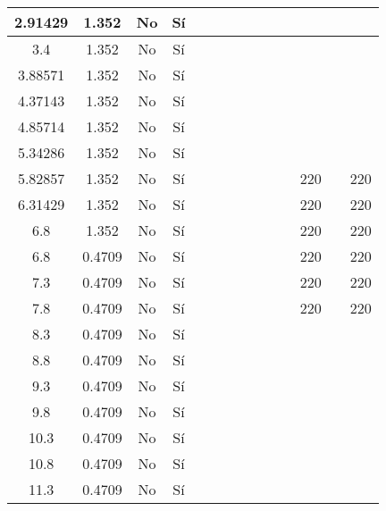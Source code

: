 \begin{table}[H]
{\begin{tabular}{|c|c|c|c|c|c|c|c|c|c|c|c|c|c|}
\hline
2.91429 & 1.352 & No  & Sí  &     &     &     &     &     &     &     &     &     &  \bigstrut\\
\hline
3.4 & 1.352 & No  & Sí  &     &     &     &     &     &     &     &     &     &  \bigstrut\\
\hline
3.88571 & 1.352 & No  & Sí  &     &     &     &     &     &     &     &     &     &  \bigstrut\\
\hline
4.37143 & 1.352 & No  & Sí  &     &     &     &     &     &     &     &     &     &  \bigstrut\\
\hline
4.85714 & 1.352 & No  & Sí  &     &     &     &     &     &     &     &     &     &  \bigstrut\\
\hline
5.34286 & 1.352 & No  & Sí  &     &     &     &     &     &     &     &     &     &  \bigstrut\\
\hline
5.82857 & 1.352 & No  & Sí  &     &     &     &     &     &     &     & 220 &     & 220 \bigstrut\\
\hline
6.31429 & 1.352 & No  & Sí  &     &     &     &     &     &     &     & 220 &     & 220 \bigstrut\\
\hline
6.8 & 1.352 & No  & Sí  &     &     &     &     &     &     &     & 220 &     & 220 \bigstrut\\
\hline
6.8 & 0.4709 & No  & Sí  &     &     &     &     &     &     &     & 220 &     & 220 \bigstrut\\
\hline
7.3 & 0.4709 & No  & Sí  &     &     &     &     &     &     &     & 220 &     & 220 \bigstrut\\
\hline
7.8 & 0.4709 & No  & Sí  &     &     &     &     &     &     &     & 220 &     & 220 \bigstrut\\
\hline
8.3 & 0.4709 & No  & Sí  &     &     &     &     &     &     &     &     &     &  \bigstrut\\
\hline
8.8 & 0.4709 & No  & Sí  &     &     &     &     &     &     &     &     &     &  \bigstrut\\
\hline
9.3 & 0.4709 & No  & Sí  &     &     &     &     &     &     &     &     &     &  \bigstrut\\
\hline
9.8 & 0.4709 & No  & Sí  &     &     &     &     &     &     &     &     &     &  \bigstrut\\
\hline
10.3 & 0.4709 & No  & Sí  &     &     &     &     &     &     &     &     &     &  \bigstrut\\
\hline
10.8 & 0.4709 & No  & Sí  &     &     &     &     &     &     &     &     &     &  \bigstrut\\
\hline
11.3 & 0.4709 & No  & Sí  &     &     &     &     &     &     &     &     &     &  \bigstrut\\

\end{tabular}}
\end{table}
